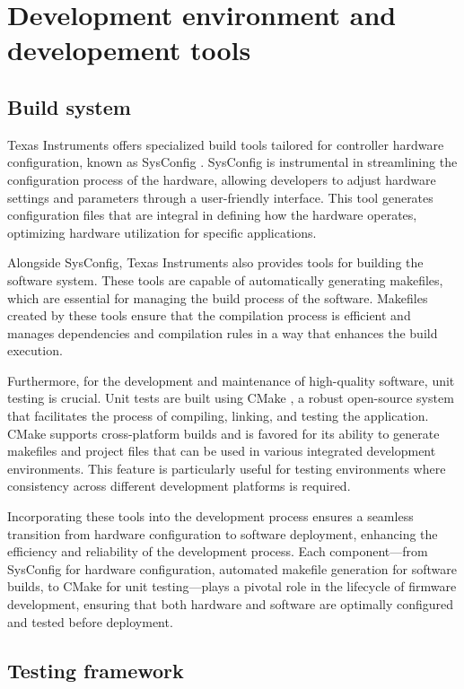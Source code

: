 \chapter{Development environment and developement tools}

\section{Build system}

Texas Instruments offers specialized build tools tailored for controller hardware configuration, known as SysConfig \cite{sysconfig}. SysConfig is instrumental in streamlining the configuration process of the hardware, allowing developers to adjust hardware settings and parameters through a user-friendly interface. This tool generates configuration files that are integral in defining how the hardware operates, optimizing hardware utilization for specific applications.

Alongside SysConfig, Texas Instruments also provides tools for building the software system. These tools are capable of automatically generating makefiles, which are essential for managing the build process of the software. Makefiles \cite{make} created by these tools ensure that the compilation process is efficient and manages dependencies and compilation rules in a way that enhances the build execution.

Furthermore, for the development and maintenance of high-quality software, unit testing is crucial. Unit tests are built using CMake \cite{cmake}, a robust open-source system that facilitates the process of compiling, linking, and testing the application. CMake supports cross-platform builds and is favored for its ability to generate makefiles and project files that can be used in various integrated development environments. This feature is particularly useful for testing environments where consistency across different development platforms is required.

Incorporating these tools into the development process ensures a seamless transition from hardware configuration to software deployment, enhancing the efficiency and reliability of the development process. Each component—from SysConfig for hardware configuration, automated makefile generation for software builds, to CMake for unit testing—plays a pivotal role in the lifecycle of firmware development, ensuring that both hardware and software are optimally configured and tested before deployment.

\section{Testing framework}

